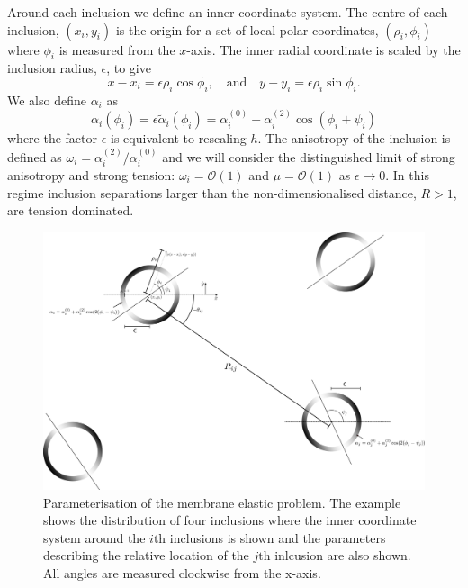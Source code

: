 Around each inclusion we define an inner coordinate system. The centre of each inclusion, $(x_i, y_i)$ is the origin for a set of local polar coordinates, $(\rho_i, \phi_i)$ where $\phi_i$ is measured from the $x$-axis. The inner radial coordinate is scaled by the inclusion radius, $\epsilon$, to give
\begin{equation}
    x-x_i = \epsilon \rho_i \cos\phi_i, \quad \text{and} \quad y-y_i = \epsilon \rho_i \sin\phi_i.
\end{equation}
We also define $\alpha_i$ as
\begin{equation}
    \alpha_i(\phi_i) = \epsilon\tilde\alpha_i(\phi_i) = \alpha_i^{(0)}+\alpha_i^{(2)}\cos(\phi_i + \psi_i)
\end{equation}
where the factor $\epsilon$ is equivalent to rescaling $h$. The anisotropy of the inclusion is defined as $\omega_i=\alpha_i^{(2)}/\alpha_i^{(0)}$ and we will consider the distinguished limit of strong anisotropy and strong tension: $\omega_i=\mathcal{O}(1)$ and $\mu=\mathcal{O}(1)$ as $\epsilon\rightarrow 0$. In this regime inclusion separations larger than the non-dimensionalised distance, $R > 1$, are tension dominated.
\begin{figure}[h]
\centering
\includegraphics[width=12cm]{figures/3-elastic-figs/boundary_shade.pdf}
\caption{Parameterisation of the membrane elastic problem. The example shows the distribution of four inclusions where the inner coordinate system around the $i\text{th}$ inclusions is shown and the parameters describing the relative location of the $j\text{th}$ inlcusion are also shown. All angles are measured clockwise from the x-axis.}
\label{fig:setup}
\end{figure}

